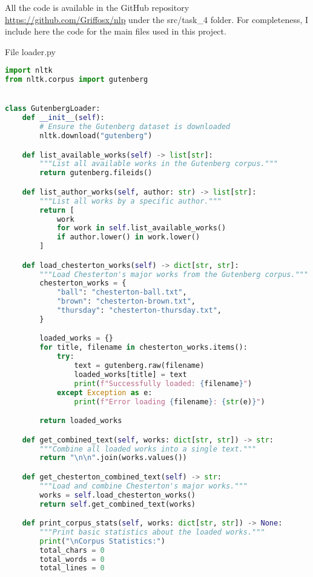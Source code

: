 \documentclass[12pt]{article}
\begin{document}
All the code is available in the GitHub repository \url{https://github.com/Griffosx/nlp} under the src/task\_4 folder.
For completeness, I include here the code for the main files used in this project.

File loader.py
\begin{lstlisting}[language=Python]
import nltk
from nltk.corpus import gutenberg


class GutenbergLoader:
    def __init__(self):
        # Ensure the Gutenberg dataset is downloaded
        nltk.download("gutenberg")

    def list_available_works(self) -> list[str]:
        """List all available works in the Gutenberg corpus."""
        return gutenberg.fileids()

    def list_author_works(self, author: str) -> list[str]:
        """List all works by a specific author."""
        return [
            work
            for work in self.list_available_works()
            if author.lower() in work.lower()
        ]

    def load_chesterton_works(self) -> dict[str, str]:
        """Load Chesterton's major works from the Gutenberg corpus."""
        chesterton_works = {
            "ball": "chesterton-ball.txt",
            "brown": "chesterton-brown.txt",
            "thursday": "chesterton-thursday.txt",
        }

        loaded_works = {}
        for title, filename in chesterton_works.items():
            try:
                text = gutenberg.raw(filename)
                loaded_works[title] = text
                print(f"Successfully loaded: {filename}")
            except Exception as e:
                print(f"Error loading {filename}: {str(e)}")

        return loaded_works

    def get_combined_text(self, works: dict[str, str]) -> str:
        """Combine all loaded works into a single text."""
        return "\n\n".join(works.values())

    def get_chesterton_combined_text(self) -> str:
        """Load and combine Chesterton's major works."""
        works = self.load_chesterton_works()
        return self.get_combined_text(works)

    def print_corpus_stats(self, works: dict[str, str]) -> None:
        """Print basic statistics about the loaded works."""
        print("\nCorpus Statistics:")
        total_chars = 0
        total_words = 0
        total_lines = 0


\end{lstlisting}
\end{document}
